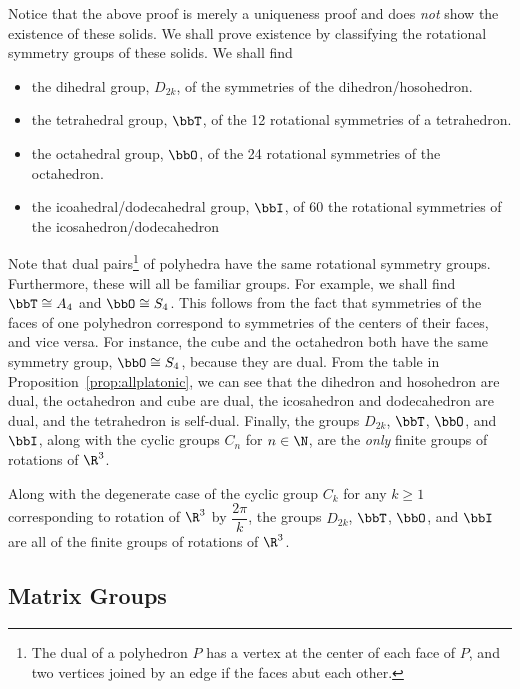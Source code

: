 Notice that the above proof is merely a uniqueness proof and does \emph{not} show the existence of these solids. We shall prove existence by classifying the rotational symmetry groups of these solids. We shall find
	\begin{itemize}
	\item the dihedral group, $D_{2k}$, of the symmetries of the dihedron/hosohedron.
	\item the tetrahedral group, $\bbT$, of the 12 rotational symmetries of a tetrahedron. 
	\item the octahedral group, $\bbO$, of the 24 rotational symmetries of the octahedron.
	\item the icoahedral/dodecahedral group, $\bbI$, of 60 the rotational symmetries of the icosahedron/dodecahedron
	\end{itemize}
Note that dual pairs\footnote{The dual of a polyhedron $P$ has a vertex at the center of each face of $P$, and two vertices joined by an edge if the faces abut each other.} of polyhedra have the same rotational symmetry groups. Furthermore, these will all be familiar groups. For example, we shall find $\bbT \cong A_4$ and $\bbO \cong S_4$. This follows from the fact that symmetries of the faces of one polyhedron correspond to symmetries of the centers of their faces, and vice versa. For instance, the cube and the octahedron both have the same symmetry group, $\bbO \cong S_4$, because they are dual. From the table in Proposition~\ref{prop:allplatonic}, we can see that the dihedron and hosohedron are dual, the octahedron and cube are dual, the icosahedron and dodecahedron are dual, and the tetrahedron is self-dual. Finally, the groups $D_{2k}$, $\bbT$, $\bbO$, and $\bbI$, along with the cyclic groups $C_n$ for $n \in \N$, are the \emph{only} finite groups of rotations of $\R^3$.


\begin{thm}
Along with the degenerate case of the cyclic group $C_k$ for any $k \geq 1$ corresponding to rotation of $\R^3$ by $\dfrac{2\pi}{k}$, the groups $D_{2k}$, $\bbT$, $\bbO$, and $\bbI$ are all of the finite groups of rotations of $\R^3$. 
\end{thm}



\subsection{Matrix Groups}

